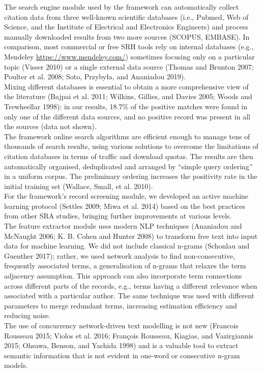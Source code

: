 \documentclass{article}
\begin{document}
The search engine module used by the framework can automatically collect
citation data from three well-known scientific databases (i.e., Pubmed,
Web of Science, and the Institute of Electrical and Electronics
Engineers) and process manually downloaded results from two more sources
(SCOPUS, EMBASE). In comparison, most commercial or free SRH tools rely
on internal databases (e.g., Mendeley \url{https://www.mendeley.com/})
sometimes focusing only on a particular topic (Visser 2010) or a single
external data source (Thomas and Brunton 2007; Poulter et al. 2008;
Soto, Przybyła, and Ananiadou 2019).\\
Mixing different databases is essential to obtain a more comprehensive
view of the literature (Bajpai et al. 2011; Wilkins, Gillies, and Davies
2005; Woods and Trewheellar 1998): in our results, 18.7\% of the
positive matches were found in only one of the different data sources,
and no positive record was present in all the sources (data not
shown).\\
The framework online search algorithms are efficient enough to manage
tens of thousands of search results, using various solutions to overcome
the limitations of citation databases in terms of traffic and download
quotas. The results are then automatically organised, deduplicated and
arranged by ``simple query ordering'' in a uniform corpus. The
preliminary ordering increases the positivity rate in the initial
training set (Wallace, Small, et al. 2010).\\

For the framework's record screening module, we developed an active
machine learning protocol (Settles 2009; Miwa et al. 2014) based on the
best practices from other SRA studies, bringing further improvements at
various levels.\\
The feature extractor module uses modern NLP techniques (Ananiadou and
McNaught 2006; K. B. Cohen and Hunter 2008) to transform free text into
input data for machine learning. We did not include classical n-grams
(Schonlau and Guenther 2017); rather, we used network analysis to find
non-consecutive, frequently associated terms, a generalisation of
n-grams that relaxes the term adjacency assumption. This approach can
also incorporate term connections across different parts of the records,
e.g., terms having a different relevance when associated with a
particular author. The same technique was used with different parameters
to merge redundant terms, increasing estimation efficiency and reducing
noise.\\
The use of concurrency network-driven text modelling is not new
(Francois Rousseau 2015; Violos et al. 2016; François Rousseau, Kiagias,
and Vazirgiannis 2015; Ohsawa, Benson, and Yachida 1998) and is a
valuable tool to extract semantic information that is not evident in
one-word or consecutive n-gram models.\\
\end{document}
